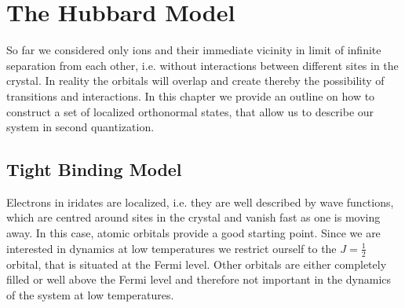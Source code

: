 \documentclass[a4paper,12pt]{report}
\begin{document}

\newpage
\section{The Hubbard Model}

So far we considered only ions and their immediate vicinity in limit of infinite separation from each other, i.e. without interactions between different sites in the crystal.
In reality the orbitals will overlap and create thereby the possibility of transitions and interactions.
In this chapter we provide an outline on how to construct a set of localized orthonormal states, that allow us to describe our system in second quantization.


\subsection{Tight Binding Model} %

Electrons in iridates are localized, i.e. they are well described by wave functions, which are centred around sites in the crystal and vanish fast as one is moving away. 
In this case, atomic orbitals provide a good starting point. 
Since we are interested in dynamics at low temperatures we restrict ourself to the $J=\frac12$ orbital, that is situated at the Fermi level. 
Other orbitals are either completely filled or well above the Fermi level and therefore not important in the dynamics of the system at low temperatures.
\end{document}
